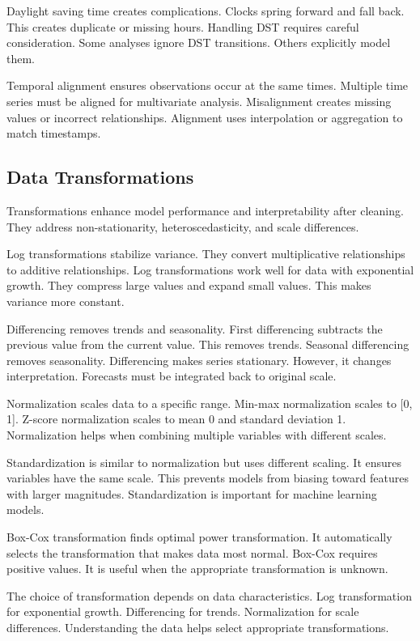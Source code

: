 Daylight saving time creates complications. Clocks spring forward and fall back. This creates duplicate or missing hours. Handling DST requires careful consideration. Some analyses ignore DST transitions. Others explicitly model them.

Temporal alignment ensures observations occur at the same times. Multiple time series must be aligned for multivariate analysis. Misalignment creates missing values or incorrect relationships. Alignment uses interpolation or aggregation to match timestamps.

\subsection{Data Transformations}

Transformations enhance model performance and interpretability after cleaning. They address non-stationarity, heteroscedasticity, and scale differences.

Log transformations stabilize variance. They convert multiplicative relationships to additive relationships. Log transformations work well for data with exponential growth. They compress large values and expand small values. This makes variance more constant.

Differencing removes trends and seasonality. First differencing subtracts the previous value from the current value. This removes trends. Seasonal differencing removes seasonality. Differencing makes series stationary. However, it changes interpretation. Forecasts must be integrated back to original scale.

Normalization scales data to a specific range. Min-max normalization scales to [0, 1]. Z-score normalization scales to mean 0 and standard deviation 1. Normalization helps when combining multiple variables with different scales.

Standardization is similar to normalization but uses different scaling. It ensures variables have the same scale. This prevents models from biasing toward features with larger magnitudes. Standardization is important for machine learning models.

Box-Cox transformation finds optimal power transformation. It automatically selects the transformation that makes data most normal. Box-Cox requires positive values. It is useful when the appropriate transformation is unknown.

The choice of transformation depends on data characteristics. Log transformation for exponential growth. Differencing for trends. Normalization for scale differences. Understanding the data helps select appropriate transformations.

